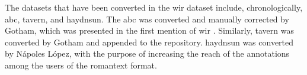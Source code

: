 
The datasets that have been converted in the \gls{wir}
dataset include, chronologically, \gls{abc}, \gls{tavern},
and \gls{haydnsun}. The \gls{abc} was converted and manually
corrected by Gotham, which was presented in the first
mention of \gls{wir} \parencite{gotham2019romantext}.
Similarly, \gls{tavern} was converted by Gotham and appended
to the repository. \gls{haydnsun} was converted by N\'apoles
L\'opez, with the purpose of increasing the reach of the
annotations among the users of the \gls{romantext} format.
